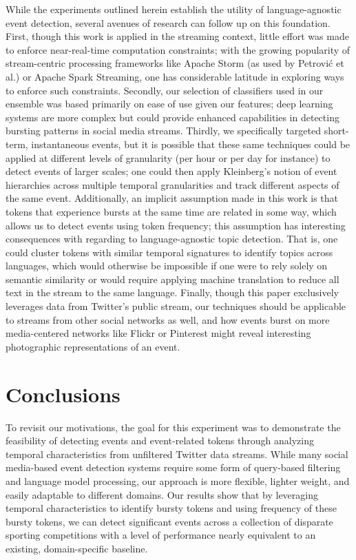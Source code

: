 \documentclass{sig-alternate}
\begin{document}
While the experiments outlined herein establish the utility of language-agnostic event detection, several avenues of research can follow up on this foundation.
First, though this work is applied in the streaming context, little effort was made to enforce near-real-time computation constraints; with the growing popularity of stream-centric processing frameworks like Apache Storm (as used by Petrovi\'{c} et al.) or Apache Spark Streaming, one has considerable latitude in exploring ways to enforce such constraints.
Secondly, our selection of classifiers used in our ensemble was based primarily on ease of use given our features; deep learning systems are more complex but could provide enhanced capabilities in detecting bursting patterns in social media streams.
Thirdly, we specifically targeted short-term, instantaneous events, but it is possible that these same techniques could be applied at different levels of granularity (per hour or per day for instance) to detect events of larger scales; one could then apply Kleinberg's notion of event hierarchies across multiple temporal granularities and track different aspects of the same event.
Additionally, an implicit assumption made in this work is that tokens that experience bursts at the same time are related in some way, which allows us to detect events using token frequency; this assumption has interesting consequences with regarding to language-agnostic topic detection.
That is, one could cluster tokens with similar temporal signatures to identify topics across languages, which would otherwise be impossible if one were to rely solely on semantic similarity or would require applying machine translation to reduce all text in the stream to the same language.
Finally, though this paper exclusively leverages data from Twitter's public stream, our techniques should be applicable to streams from other social networks as well, and how events burst on more media-centered networks like Flickr or Pinterest might reveal interesting photographic representations of an event.

\section{Conclusions}
\label{sect:conlusions}

To revisit our motivations, the goal for this experiment was to demonstrate the feasibility of detecting events and event-related tokens through analyzing temporal characteristics from unfiltered Twitter data streams.
While many social media-based event detection systems require some form of query-based filtering and language model processing, our approach is more flexible, lighter weight, and easily adaptable to different domains.
Our results show that by leveraging temporal characteristics to identify bursty tokens and using frequency of these bursty tokens, we can detect significant events across a collection of disparate sporting competitions with a level of performance nearly equivalent to an existing, domain-specific baseline.
\end{document}
